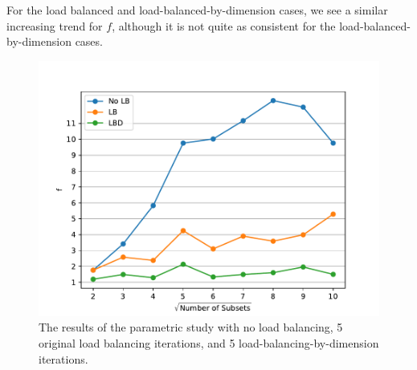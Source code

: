 For the load balanced and load-balanced-by-dimension cases, we see a similar increasing trend for $f$, although it is not quite as consistent for the load-balanced-by-dimension cases.
\begin{figure}[H]
\centering
\includegraphics[scale=0.7]{../figures/metric_study.pdf}
\caption{The results of the parametric study with no load balancing, 5 original load balancing iterations, and 5 load-balancing-by-dimension iterations.}
\label{metric_study}
\end{figure}
\begin{table}[H]
\centering
\caption{The tabulated results of the parametric study shown in Fig.~\ref{metric_study} with no load balancing, 5 original load balancing iterations (LB), and 5 load-balancing-by-dimension (LBD) iterations.}
\label{metric_study_table}
\end{table}


